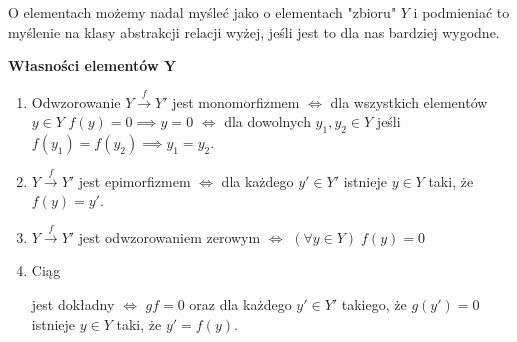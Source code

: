 O elementach możemy nadal myśleć jako o elementach "zbioru" $Y$ i podmieniać to myślenie na klasy abstrakcji relacji wyżej, jeśli jest to dla nas bardziej wygodne.

{\large\bfseries\color{green}Własności elementów $\mathbf{Y}$}

\begin{enumerate}
  \item Odwzorowanie $Y\xrightarrow{f}Y'$ jest monomorfizmem $\iff$ dla wszystkich elementów $y\in Y$ $f(y)=0\implies y=0$ $\iff$ dla dowolnych $y_1,y_2\in Y$ jeśli $f(y_1)=f(y_2)\implies y_1=y_2$.
  \item $Y\xrightarrow{f}Y'$ jest epimorfizmem $\iff$ dla każdego $y'\in Y'$ istnieje $y\in Y$ taki, że $f(y)=y'$.
  \item $Y\xrightarrow{f}Y'$ jest odwzorowaniem zerowym $\iff$ $(\forall y\in Y)\;f(y)=0$
  \item Ciąg  jest dokładny $\iff$ $gf=0$ oraz dla każdego $y'\in Y'$ takiego, że $g(y')=0$ istnieje $y\in Y$ taki, że $y'=f(y)$.
\end{enumerate}
